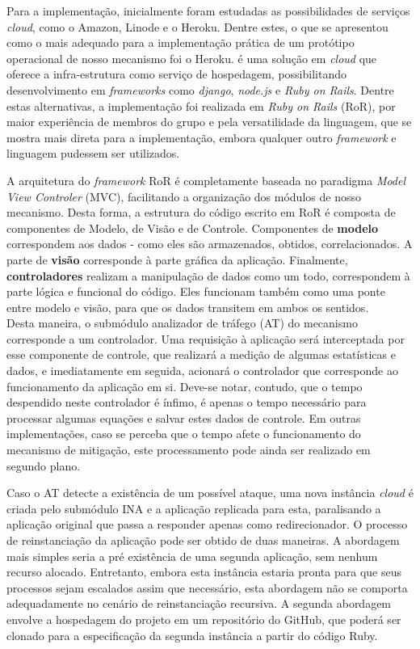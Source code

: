 Para a implementação, inicialmente foram estudadas as possibilidades de serviços \emph{cloud}, como o Amazon, Linode e o Heroku. Dentre estes, o que se apresentou como o mais adequado para a implementação prática de um protótipo operacional de nosso mecanismo foi o Heroku. \cite{heroku} é uma solução em \emph{cloud} que oferece a infra-estrutura como serviço de hospedagem, possibilitando desenvolvimento em \emph{frameworks} como \emph{django}, \emph{node.js} e \emph{Ruby on Rails}. Dentre estas alternativas, a implementação foi realizada em \emph{Ruby on Rails} (RoR), por maior experiência de membros do grupo e pela versatilidade da linguagem, que se mostra mais direta para a implementação, embora qualquer outro \emph{framework} e linguagem pudessem ser utilizados.

A arquitetura do \emph{framework} RoR é completamente baseada no paradigma \emph{Model View Controler} (MVC), facilitando a organização dos módulos de nosso mecanismo. Desta forma, a estrutura do código escrito em RoR é composta de componentes de Modelo, de Visão e de Controle. Componentes de \textbf{modelo} correspondem aos dados - como eles são armazenados, obtidos, correlacionados. A parte de \textbf{visão} corresponde à parte gráfica da aplicação. Finalmente, \textbf{controladores} realizam a manipulação de dados como um todo, correspondem à parte lógica e funcional do código. Eles funcionam também como uma ponte entre modelo e visão, para que os dados transitem em ambos os sentidos.\\

Desta maneira, o submódulo analizador de tráfego (AT) do mecanismo corresponde a um controlador. Uma requisição à aplicação será interceptada por esse componente de controle, que realizará a medição de algumas estatísticas e dados, e imediatamente em seguida, acionará o controlador que corresponde ao funcionamento da aplicação em si. Deve-se notar, contudo, que o tempo despendido neste controlador é ínfimo, é apenas o tempo necessário para processar algumas equações e salvar estes dados de controle. Em outras implementações, caso se perceba que o tempo afete o funcionamento do mecanismo de mitigação, este processamento pode ainda ser realizado em segundo plano.

Caso o AT detecte a existência de um possível ataque, uma nova instância \emph{cloud} é criada pelo submódulo INA e a aplicação replicada para esta, paralisando a aplicação original que passa a responder apenas como redirecionador. O processo de reinstanciação da aplicação pode ser obtido de duas maneiras. A abordagem mais simples seria a pré existência de uma segunda aplicação, sem nenhum recurso alocado. Entretanto, embora esta instância estaria pronta para que seus processos sejam escalados assim que necessário, esta abordagem não se comporta adequadamente no cenário de reinstanciação recursiva. A segunda abordagem envolve a hospedagem do projeto em um repositório do GitHub, que poderá ser clonado para a especificação da segunda instância a partir do código Ruby. 

